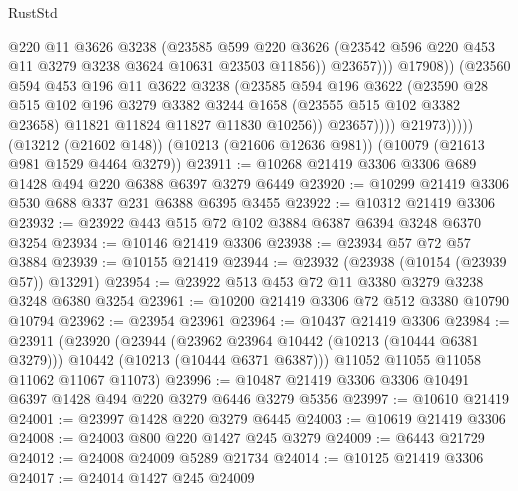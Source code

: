 \begin{lexlean}{RustStd}
\begin{coremodule}
{\begin{coremodule}
{{{{{{{{{{{{{{{{{{{{{{{{{{                              @220
                              @11
                              @3626
                              @3238
                              (@23585
                                @599
                                @220
                                @3626
                                (@23542 @596 @220 @453 @11 @3279 @3238 @3624 @10631 @23503 @11856))
                              @23657)))
                        @17908))
                    (@23560
                      @594
                      @453
                      @196
                      @11
                      @3622
                      @3238
                      (@23585
                        @594
                        @196
                        @3622
                        (@23590
                          @28
                          @515
                          @102
                          @196
                          @3279
                          @3382
                          @3244
                          @1658
                          (@23555 @515 @102 @3382 @23658)
                          @11821
                          @11824
                          @11827
                          @11830
                          @10256))
                      @23657))))
              @21973)))))
    (@13212 (@21602 @148))
    (@10213 (@21606 @12636 @981))
    (@10079 (@21613 @981 @1529 @4464 @3279))
@23911 := @10268 @21419 @3306 @3306 @689 @1428 @494 @220 @6388 @6397 @3279 @6449
@23920 := @10299 @21419 @3306 @530 @688 @337 @231 @6388 @6395 @3455
@23922 := @10312 @21419 @3306
@23932 := @23922 @443 @515 @72 @102 @3884 @6387 @6394 @3248 @6370 @3254
@23934 := @10146 @21419 @3306
@23938 := @23934 @57 @72 @57 @3884
@23939 := @10155 @21419
@23944 := @23932 (@23938 (@10154 (@23939 @57)) @13291)
@23954 := @23922 @513 @453 @72 @11 @3380 @3279 @3238 @3248 @6380 @3254
@23961 := @10200 @21419 @3306 @72 @512 @3380 @10790 @10794
@23962 := @23954 @23961
@23964 := @10437 @21419 @3306
@23984 := @23911
    (@23920
      (@23944
        (@23962 @23964 @10442 (@10213 (@10444 @6381 @3279)))
        @10442
        (@10213 (@10444 @6371 @6387)))
      @11052
      @11055
      @11058
      @11062
      @11067
      @11073)
@23996 := @10487 @21419 @3306 @3306 @10491 @6397 @1428 @494 @220 @3279 @6446 @3279 @5356
@23997 := @10610 @21419
@24001 := @23997 @1428 @220 @3279 @6445
@24003 := @10619 @21419 @3306
@24008 := @24003 @800 @220 @1427 @245 @3279
@24009 := @6443 @21729
@24012 := @24008 @24009 @5289 @21734
@24014 := @10125 @21419 @3306
@24017 := @24014 @1427 @245 @24009
}}}}}}}}}}}}}}}}}}}}}}}}}}
\end{coremodule}}
\end{coremodule}
\end{lexlean}
